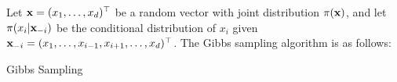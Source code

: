 Let ${\bf x}=(x_{1},\ldots,x_{d})^{\top}$ be a random vector with joint distribution $\pi({\bf x})$, and let $\pi(x_{i}|{\bf x}_{-i})$ be the conditional distribution of $x_{i}$ given ${\bf x}_{-i}=(x_{1},\ldots,x_{i-1},x_{i+1},\ldots,x_{d})^{\top}$. The Gibbs sampling algorithm is as follows:
\begin{algorithm}
	\caption{Gibbs Sampling}
\end{algorithm}

